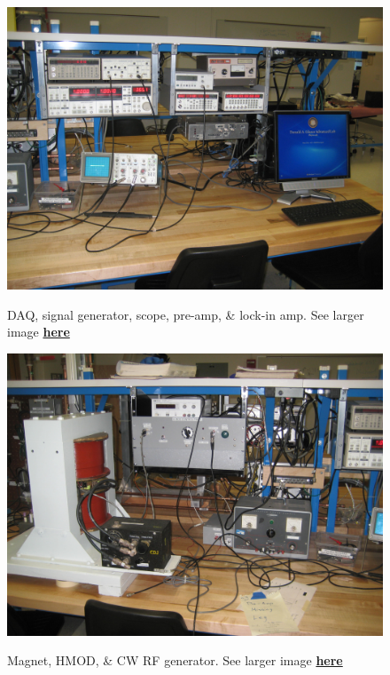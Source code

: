 \documentclass{../lab}
\begin{document}
\begin{figure}[h]
\begin{minipage}{0.32\textwidth}
    \href{http://experimentationlab.berkeley.edu/sites/default/files/images/NMR_Exp_3496.jpg}{\includegraphics[width=\linewidth,keepaspectratio]{images/NMR_Exp_3496.jpg}}
    \caption{DAQ, signal generator, scope, pre-amp, \& lock-in amp. See larger image \href{http://experimentationlab.berkeley.edu/sites/default/files/images/NMR_Exp_3496.jpg}{\textbf{here}}}
\end{minipage}
\begin{minipage}{0.32\textwidth}
    \href{http://experimentationlab.berkeley.edu/sites/default/files/images/NMR_Exp_3557.jpg}{\includegraphics[width=\linewidth,keepaspectratio]{images/NMR_Exp_3557.jpg}}
    \caption{Magnet, HMOD, \& CW RF generator. See larger image \href{http://experimentationlab.berkeley.edu/sites/default/files/images/NMR_Exp_3557.jpg}{\textbf{here}}}
\end{minipage}


\end{figure}
\end{document}
